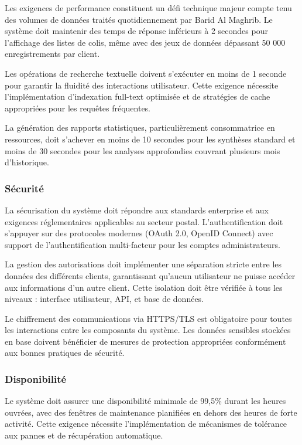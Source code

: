 Les exigences de performance constituent un défi technique majeur compte tenu des volumes de données traités quotidiennement par Barid Al Maghrib. Le système doit maintenir des temps de réponse inférieurs à 2 secondes pour l'affichage des listes de colis, même avec des jeux de données dépassant 50 000 enregistrements par client.

Les opérations de recherche textuelle doivent s'exécuter en moins de 1 seconde pour garantir la fluidité des interactions utilisateur. Cette exigence nécessite l'implémentation d'indexation full-text optimisée et de stratégies de cache appropriées pour les requêtes fréquentes.

La génération des rapports statistiques, particulièrement consommatrice en ressources, doit s'achever en moins de 10 secondes pour les synthèses standard et moins de 30 secondes pour les analyses approfondies couvrant plusieurs mois d'historique.

\subsubsection{Sécurité}

La sécurisation du système doit répondre aux standards enterprise et aux exigences réglementaires applicables au secteur postal. L'authentification doit s'appuyer sur des protocoles modernes (OAuth 2.0, OpenID Connect) avec support de l'authentification multi-facteur pour les comptes administrateurs.

La gestion des autorisations doit implémenter une séparation stricte entre les données des différents clients, garantissant qu'aucun utilisateur ne puisse accéder aux informations d'un autre client. Cette isolation doit être vérifiée à tous les niveaux : interface utilisateur, API, et base de données.

Le chiffrement des communications via HTTPS/TLS est obligatoire pour toutes les interactions entre les composants du système. Les données sensibles stockées en base doivent bénéficier de mesures de protection appropriées conformément aux bonnes pratiques de sécurité.

\subsubsection{Disponibilité}

Le système doit assurer une disponibilité minimale de 99,5\% durant les heures ouvrées, avec des fenêtres de maintenance planifiées en dehors des heures de forte activité. Cette exigence nécessite l'implémentation de mécanismes de tolérance aux pannes et de récupération automatique.

